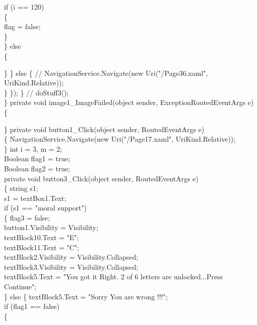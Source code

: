 {{                            if (i == 120)\\
                            \{\\
                                flag = false;\\
                            \}\\
                        \}
                        else\\
                        \{
                            
                        \}
                    \}
                    else
                    \{
                       // NavigationService.Navigate(new Uri("/Page36.xaml", UriKind.Relative));\\
                    \}
                \});
            \}
            //    doStuff3();\\
        \}
        private void image1_ImageFailed(object sender, ExceptionRoutedEventArgs e)\\
        \{

        \}
        private void button1_Click(object sender, RoutedEventArgs e)\\
        \{
            NavigationService.Navigate(new Uri("/Page17.xaml", UriKind.Relative));\\
        \}
        int i = 3, m = 2;\\
        Boolean flag1 = true;\\
        Boolean flag2 = true;\\
        private void button3_Click(object sender, RoutedEventArgs e)\\
        \{
            string s1;\\
            s1 = textBox1.Text;\\
            if (s1 == "moral support")\\
            \{
                flag3 = false;\\
                button1.Visibility = Visibility;\\
                textBlock10.Text = "E";\\
                textBlock11.Text = "C";\\
                textBlock2.Visibility = Visibility.Collapsed;\\
                textBlock3.Visibility = Visibility.Collapsed;\\
                textBlock5.Text = "You got it Right. 2 of 6 letters are unlocked...Press Continue";\\
            \}
            else
            \{
                textBlock5.Text = "Sorry You are wrong !!!";\\
                if (flag1 == false)\\
                \{

}}
